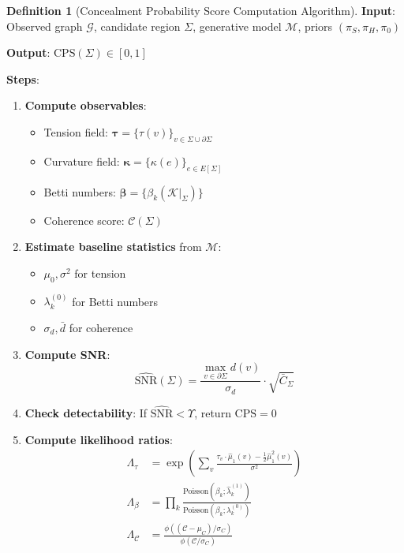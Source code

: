 \documentclass[12pt,a4paper]{article}
\theoremstyle{definition}
\newtheorem{definition}{Definition}[section]
\theoremstyle{remark}
\newcommand{\Graph}{\mathcal{G}}         %
\newcommand{\Yharim}{\Upsilon}           %
\begin{document}
\begin{definition}[Concealment Probability Score Computation Algorithm]
\label{alg:cps}
\textbf{Input}: Observed graph $\Graph$, candidate region $\Sigma$, generative model $\mathcal{M}$, priors $(\pi_S, \pi_H, \pi_0)$

\textbf{Output}: $\text{CPS}(\Sigma) \in [0, 1]$

\textbf{Steps}:
\begin{enumerate}
    \item \textbf{Compute observables}:
    \begin{itemize}
        \item Tension field: $\boldsymbol{\tau} = \{\tau(v)\}_{v \in \Sigma \cup \partial\Sigma}$
        \item Curvature field: $\boldsymbol{\kappa} = \{\kappa(e)\}_{e \in E[\Sigma]}$
        \item Betti numbers: $\boldsymbol{\beta} = \{\beta_k(\mathcal{K}|_\Sigma)\}$
        \item Coherence score: $\mathcal{C}(\Sigma)$
    \end{itemize}
    
    \item \textbf{Estimate baseline statistics} from $\mathcal{M}$:
    \begin{itemize}
        \item $\mu_0, \sigma^2$ for tension
        \item $\lambda_k^{(0)}$ for Betti numbers
        \item $\sigma_d, \bar{d}$ for coherence
    \end{itemize}
    
    \item \textbf{Compute SNR}:
    \begin{equation}
        \widehat{\text{SNR}}(\Sigma) = \frac{\max_{v \in \partial\Sigma} d(v)}{\sigma_d} \cdot \sqrt{\bar{C}_\Sigma}
    \end{equation}
    
    \item \textbf{Check detectability}: If $\widehat{\text{SNR}} < \Yharim$, return $\text{CPS} = 0$
    
    \item \textbf{Compute likelihood ratios}:
    \begin{align}
        \Lambda_\tau &= \exp\left( \sum_v \frac{\tau_v \cdot \hat{\mu}_1(v) - \frac{1}{2}\hat{\mu}_1^2(v)}{\sigma^2} \right) \\
        \Lambda_\beta &= \prod_k \frac{\text{Poisson}(\beta_k; \hat{\lambda}_k^{(1)})}{\text{Poisson}(\beta_k; \lambda_k^{(0)})} \\
        \Lambda_{\mathcal{C}} &= \frac{\phi((\mathcal{C} - \mu_C)/\sigma_C)}{\phi(\mathcal{C}/\sigma_C)}
    \end{align}
    

\end{enumerate}
\end{definition}
\end{document}
